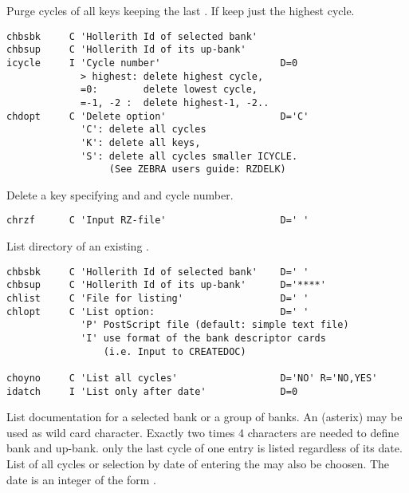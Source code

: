 Purge cycles of all keys keeping the last .
If  keep just the highest cycle.
 
 
\begin{verbatim}
chbsbk     C 'Hollerith Id of selected bank'
chbsup     C 'Hollerith Id of its up-bank'
icycle     I 'Cycle number'                     D=0
             > highest: delete highest cycle,
             =0:        delete lowest cycle,
             =-1, -2 :  delete highest-1, -2..
chdopt     C 'Delete option'                    D='C'
             'C': delete all cycles
             'K': delete all keys,
             'S': delete all cycles smaller ICYCLE.
                  (See ZEBRA users guide: RZDELK)
\end{verbatim}
 
Delete a key specifying  and  and cycle number.
 
 
\begin{verbatim}
chrzf      C 'Input RZ-file'                    D=' '
\end{verbatim}
 
List directory of an existing \RZfile.
 
 
\begin{verbatim}
chbsbk     C 'Hollerith Id of selected bank'    D=' '
chbsup     C 'Hollerith Id of its up-bank'      D='****'
chlist     C 'File for listing'                 D=' '
chlopt     C 'List option:                      D=' '
             'P' PostScript file (default: simple text file)
             'I' use format of the bank descriptor cards
                 (i.e. Input to CREATEDOC)   
 
choyno     C 'List all cycles'                  D='NO' R='NO,YES'
idatch     I 'List only after date'             D=0
\end{verbatim}
 
List documentation for a selected bank or a group of banks.
An  (asterix) may be used as wild card character.
Exactly two times 4 characters are needed to define bank and up-bank.
only the last cycle of one entry is listed regardless of its date.
List of all cycles or selection by date of entering the \RZfile{} may
also be choosen. The date is an integer of the form .
 

